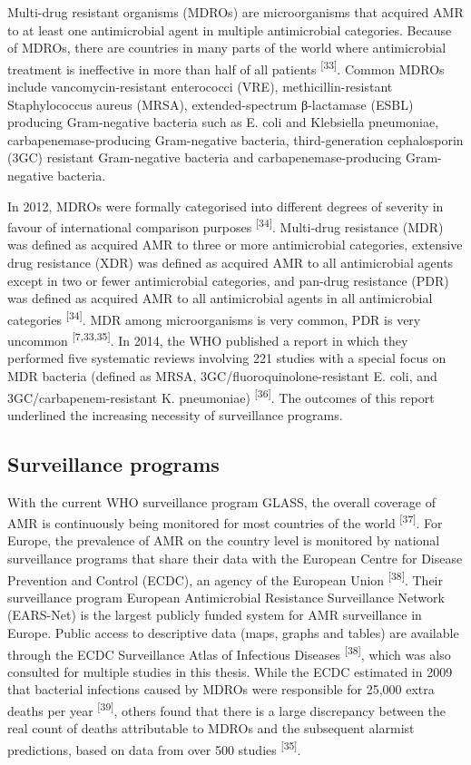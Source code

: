 \documentclass[
]{book}
\begin{document}
Multi-drug resistant organisms (MDROs) are microorganisms that acquired AMR to at least one antimicrobial agent in multiple antimicrobial categories. Because of MDROs, there are countries in many parts of the world where antimicrobial treatment is ineffective in more than half of all patients \textsuperscript{{[}33{]}}. Common MDROs include vancomycin-resistant enterococci (VRE), methicillin-resistant Staphylococcus aureus (MRSA), extended-spectrum β-lactamase (ESBL) producing Gram-negative bacteria such as E. coli and Klebsiella pneumoniae, carbapenemase-producing Gram-negative bacteria, third-generation cephalosporin (3GC) resistant Gram-negative bacteria and carbapenemase-producing Gram-negative bacteria.

In 2012, MDROs were formally categorised into different degrees of severity in favour of international comparison purposes \textsuperscript{{[}34{]}}. Multi-drug resistance (MDR) was defined as acquired AMR to three or more antimicrobial categories, extensive drug resistance (XDR) was defined as acquired AMR to all antimicrobial agents except in two or fewer antimicrobial categories, and pan-drug resistance (PDR) was defined as acquired AMR to all antimicrobial agents in all antimicrobial categories \textsuperscript{{[}34{]}}. MDR among microorganisms is very common, PDR is very uncommon \textsuperscript{{[}7,33,35{]}}. In 2014, the WHO published a report in which they performed five systematic reviews involving 221 studies with a special focus on MDR bacteria (defined as MRSA, 3GC/fluoroquinolone-resistant E. coli, and 3GC/carbapenem-resistant K. pneumoniae) \textsuperscript{{[}36{]}}. The outcomes of this report underlined the increasing necessity of surveillance programs.

\hypertarget{surveillance-programs}{%
\subsection{Surveillance programs}\label{surveillance-programs}}

With the current WHO surveillance program GLASS, the overall coverage of AMR is continuously being monitored for most countries of the world \textsuperscript{{[}37{]}}. For Europe, the prevalence of AMR on the country level is monitored by national surveillance programs that share their data with the European Centre for Disease Prevention and Control (ECDC), an agency of the European Union \textsuperscript{{[}38{]}}. Their surveillance program European Antimicrobial Resistance Surveillance Network (EARS-Net) is the largest publicly funded system for AMR surveillance in Europe. Public access to descriptive data (maps, graphs and tables) are available through the ECDC Surveillance Atlas of Infectious Diseases \textsuperscript{{[}38{]}}, which was also consulted for multiple studies in this thesis. While the ECDC estimated in 2009 that bacterial infections caused by MDROs were responsible for 25,000 extra deaths per year \textsuperscript{{[}39{]}}, others found that there is a large discrepancy between the real count of deaths attributable to MDROs and the subsequent alarmist predictions, based on data from over 500 studies \textsuperscript{{[}35{]}}.
\end{document}
